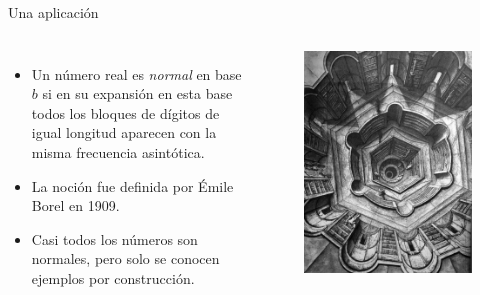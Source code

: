 \documentclass[spanish,xcolor={table}]{beamer}
\begin{document}
\begin{frame}{Una aplicación}

  \begin{columns}
  
    \begin{itemize}
      \item Un número real es \emph{normal} en base $b$ si en su expansión en esta base  todos los bloques de dígitos de igual longitud aparecen con la misma frecuencia asintótica.
      \item La noción fue definida por Émile Borel en 1909.
      \item Casi todos los números son normales, pero solo se conocen ejemplos por construcción.
    \end{itemize}

    \begin{figure}
      \includegraphics[width=\textwidth]{babel.jpg}
    \end{figure}
  \end{columns}

\end{frame}
\end{document}
